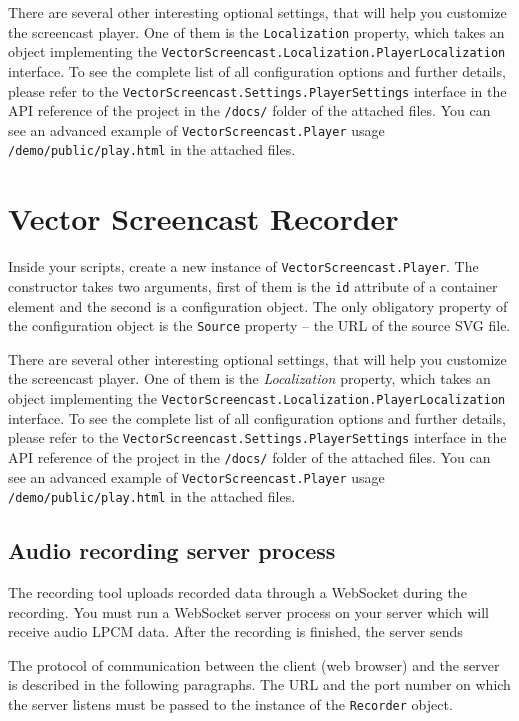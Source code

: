 There are several other interesting optional settings, that will help you customize the screencast player. One of them is the \verb|Localization| property, which takes an object implementing the \verb|VectorScreencast.Localization.PlayerLocalization| interface. To see the complete list of all configuration options and further details, please refer to the \verb|VectorScreencast.Settings.PlayerSettings| interface in the API reference of the project in the \verb|/docs/| folder of the attached files. You can see an advanced example of \verb|VectorScreencast.Player| usage \verb|/demo/public/play.html| in the attached files.

\section{Vector Screencast Recorder}

Inside your scripts, create a new instance of \verb|VectorScreencast.Player|. The constructor takes two arguments, first of them is the \verb|id| attribute of a container element and the second is a configuration object. The only obligatory property of the configuration object is the \verb|Source| property -- the URL of the source SVG file. 

There are several other interesting optional settings, that will help you customize the screencast player. One of them is the \textit{Localization} property, which takes an object implementing the \verb|VectorScreencast.Localization.PlayerLocalization| interface. To see the complete list of all configuration options and further details, please refer to the \verb|VectorScreencast.Settings.PlayerSettings| interface in the API reference of the project in the \verb|/docs/| folder of the attached files. You can see an advanced example of \verb|VectorScreencast.Player| usage \verb|/demo/public/play.html| in the attached files.

\subsection{Audio recording server process}
\label{websocket-protocol}

The recording tool uploads recorded data through a WebSocket during the recording. You must run a WebSocket server process on your server which will receive audio LPCM data. After the recording is finished, the server sends 

The protocol of communication between the client (web browser) and the server is described in the following paragraphs. The URL and the port number on which the server listens must be passed to the instance of the \verb|Recorder| object.

